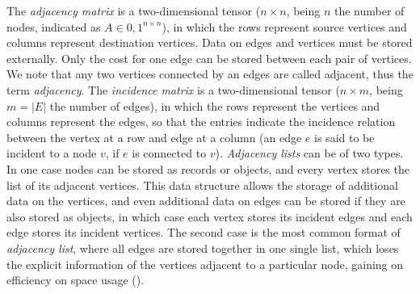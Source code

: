 \documentclass[binding=0.6cm]{sapthesis}
\newcommand{\mycite}[1]{(\cite{#1})}
\begin{document}

The \textit{adjacency matrix} is a two-dimensional tensor ($n \times n$, being $n$ the number of nodes, indicated as $A \in {0,1}^{n\times n}$), in which the rows represent source vertices and columns represent destination vertices. Data on edges and vertices must be stored externally. Only the cost for one edge can be stored between each pair of vertices. We note that any two vertices connected by an edges are called adjacent, thus the term \textit{adjacency}. The \textit{incidence matrix} is a two-dimensional tensor ($n \times m$, being $m = |E|$ the number of edges), in which the rows represent the vertices and columns represent the edges, so that the entries indicate the incidence relation between the vertex at a row and edge at a column (an edge $e$ is said to be incident to a node $v$, if $e$ is connected to $v$). \textit{Adjacency lists} can be of two types. In one case nodes can be stored as records or objects, and every vertex stores the list of its adjacent vertices. This data structure allows the storage of additional data on the vertices, and even additional data on edges can be stored if they are also stored as objects, in which case each vertex stores its incident edges and each edge stores its incident vertices. The second case is the most common format of \textit{adjacency list}, where all edges are stored together in one single list, which loses the explicit information of the vertices adjacent to a particular node, gaining on efficiency on space usage \mycite{cormen2022introduction}.  
\end{document}
